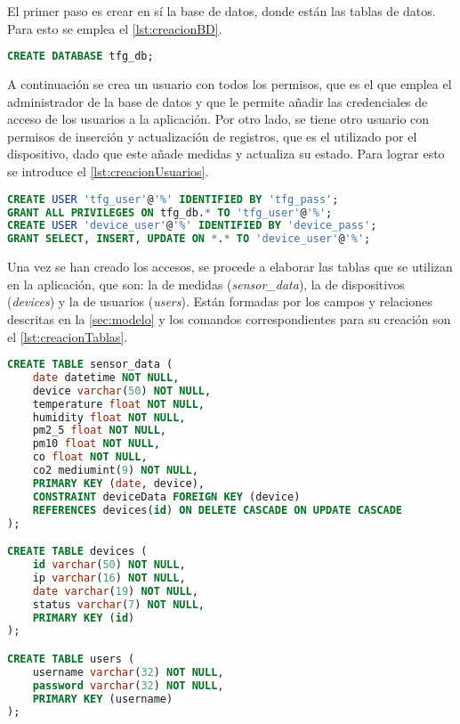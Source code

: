 El primer paso es crear en sí la base de datos, donde están las tablas de datos. Para esto se emplea el \autoref{lst:creacionBD}.
\begin{lstlisting}[language=SQL, caption=Creación de la base de datos,label=lst:creacionBD]
CREATE DATABASE tfg_db;
\end{lstlisting}

A continuación se crea un usuario con todos los permisos, que es el que emplea el administrador de la base de datos y que le permite añadir las credenciales de acceso de los usuarios a la aplicación. Por otro lado, se tiene otro usuario con permisos de inserción y actualización de registros, que es el utilizado por el dispositivo, dado que este añade medidas y actualiza su estado. Para lograr esto se introduce el \autoref{lst:creacionUsuarios}.
\begin{lstlisting}[language=SQL, caption=Creación de usuarios de la base de datos, label=lst:creacionUsuarios]
CREATE USER 'tfg_user'@'%' IDENTIFIED BY 'tfg_pass';
GRANT ALL PRIVILEGES ON tfg_db.* TO 'tfg_user'@'%';
CREATE USER 'device_user'@'%' IDENTIFIED BY 'device_pass';
GRANT SELECT, INSERT, UPDATE ON *.* TO 'device_user'@'%';
\end{lstlisting}

Una vez se han creado los accesos, se procede a elaborar las tablas que se utilizan en la aplicación, que son: la de medidas (\textit{sensor\_data}), la de dispositivos (\textit{devices}) y la de usuarios (\textit{users}). Están formadas por los campos y relaciones descritas en la \autoref{sec:modelo} y los comandos correspondientes para su creación son el \autoref{lst:creacionTablas}.
\begin{lstlisting}[language=SQL, caption=Creación de tablas de la base de datos, label=lst:creacionTablas]
CREATE TABLE sensor_data (
    date datetime NOT NULL,
    device varchar(50) NOT NULL,
    temperature float NOT NULL,
    humidity float NOT NULL,
    pm2_5 float NOT NULL,
    pm10 float NOT NULL,
    co float NOT NULL,
    co2 mediumint(9) NOT NULL,
    PRIMARY KEY (date, device),
    CONSTRAINT deviceData FOREIGN KEY (device) 
    REFERENCES devices(id) ON DELETE CASCADE ON UPDATE CASCADE
);

CREATE TABLE devices (
    id varchar(50) NOT NULL,
    ip varchar(16) NOT NULL,
    date varchar(19) NOT NULL,
    status varchar(7) NOT NULL,
    PRIMARY KEY (id)
);

CREATE TABLE users (
    username varchar(32) NOT NULL,
    password varchar(32) NOT NULL,
    PRIMARY KEY (username)
);
\end{lstlisting}

